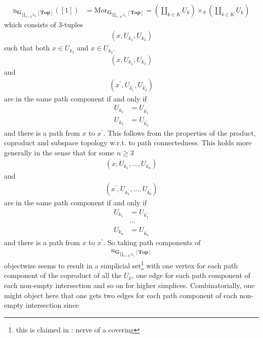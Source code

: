 \begin{align*}
  \mathrm{n}_{\mathbf{G}_{\coprod_{k \in K}\mathrm{i}_{U_{k}}}[\mathbf{Top}]}
  ([1])
  &=
  \mathrm{Mor}_{\mathbf{G}_{\coprod_{k \in K}\mathrm{i}_{U_{k}}}[\mathbf{Top}]}
  =
  \left(
    \coprod_{k \in K}
    U_{k}
  \right)
  \times_{S}
  \left(
    \coprod_{k \in K}
    U_{k}
  \right)
\end{align*}
which consists of $3$-tuples
\begin{align*}
  \left(
    x,
    U_{k_{1}},
    U_{k_{2}}
  \right)
\end{align*}
such that both $x \in U_{k_{1}}$ and $x \in U_{k_{2}}$. 
\begin{align*}
  \left(
    x,
    U_{k_{1}},
    U_{k_{2}}
  \right)
\end{align*}
and
\begin{align*}
  \left(
    x^{\backprime},
    U_{k_{1}^{\backprime}},
    U_{k_{2}^{\backprime}}
  \right)
\end{align*}
are in the same path component if and only if
\begin{align*}
  U_{k_{1}}
  &=
  U_{k_{1}^{\backprime}}
  \\
  U_{k_{2}}
  &=
  U_{k_{2}^{\backprime}}
\end{align*}
and there is a path from $x$ to $x^{\backprime}$. This follows from the properties of the product, coproduct and subspace topology w.r.t. to path connectedness. This holds more generally in the sense that for some $n \geq 3$
\begin{align*}
  \left(
    x,
    U_{k_{1}},
    \ldots,
    U_{k_{n}}
  \right)
\end{align*}
and
\begin{align*}
  \left(
    x^{\backprime},
    U_{k_{1}^{\backprime}},
    \ldots,
    U_{k_{b}^{\backprime}}
  \right)
\end{align*}
are in the same path component if and only if
\begin{align*}
  U_{k_{1}}
  &=
  U_{k_{1}^{\backprime}}
  \\
  &\cdots
  \\
  U_{k_{n}}
  &=
  U_{k_{n}^{\backprime}}
\end{align*}
and there is a path from $x$ to $x^{\backprime}$. So taking path components of
\begin{align*}
  \mathrm{n}_{\mathbf{G}_{\coprod_{k \in K}\mathrm{i}_{U_{k}}}[\mathbf{Top}]}
\end{align*}
objectwise seems to result in a simplicial set\footnote{this is claimed in \cite{wiki-pedia0en}: nerve of a covering} with one vertex for each path component of the coproduct of all the $U_{k}$, one edge for each path component of each non-empty intersection and so on for higher simplices. Combinatorially, one might object here that one gets two edges for each path component of each non-empty intersection since
